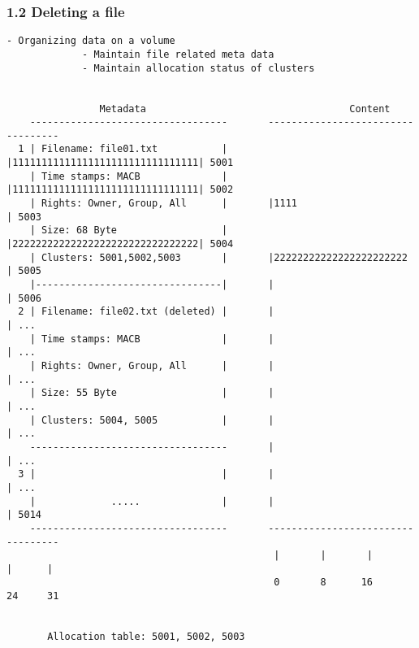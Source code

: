 \begin{frame}[fragile]
  \frametitle{1.2 Deleting a file}
  \begin{lstlisting}[basicstyle=\tiny\ttfamily]
             - Organizing data on a volume
             - Maintain file related meta data
             - Maintain allocation status of clusters
                            

                Metadata                                   Content     
    ----------------------------------       ----------------------------------
  1 | Filename: file01.txt           |       |11111111111111111111111111111111| 5001
    | Time stamps: MACB              |       |11111111111111111111111111111111| 5002
    | Rights: Owner, Group, All      |       |1111                            | 5003
    | Size: 68 Byte                  |       |22222222222222222222222222222222| 5004
    | Clusters: 5001,5002,5003       |       |22222222222222222222222         | 5005
    |--------------------------------|       |                                | 5006
  2 | Filename: file02.txt (deleted) |       |                                | ...
    | Time stamps: MACB              |       |                                | ...
    | Rights: Owner, Group, All      |       |                                | ...
    | Size: 55 Byte                  |       |                                | ...
    | Clusters: 5004, 5005           |       |                                | ...
    ----------------------------------       |                                | ...
  3 |                                |       |                                | ...
    |             .....              |       |                                | 5014
    ----------------------------------       ----------------------------------
                                              |       |       |       |      |
                                              0       8      16      24     31


       Allocation table: 5001, 5002, 5003
  \end{lstlisting}
\end{frame}


